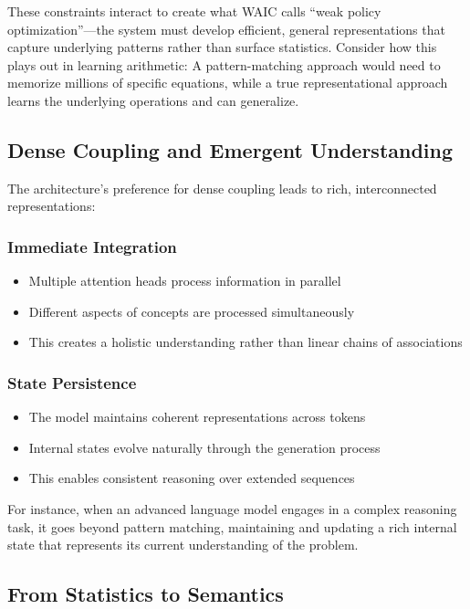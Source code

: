 \documentclass[12pt]{article}
\begin{document}
These constraints interact to create what WAIC calls ``weak policy optimization''---the system must develop efficient, general representations that capture underlying patterns rather than surface statistics. Consider how this plays out in learning arithmetic: A pattern-matching approach would need to memorize millions of specific equations, while a true representational approach learns the underlying operations and can generalize.

\subsection{Dense Coupling and Emergent Understanding}

The architecture's preference for dense coupling leads to rich, interconnected representations:

\subsubsection{Immediate Integration}
\begin{itemize}
    \item Multiple attention heads process information in parallel
    \item Different aspects of concepts are processed simultaneously
    \item This creates a holistic understanding rather than linear chains of associations
\end{itemize}

\subsubsection{State Persistence}
\begin{itemize}
    \item The model maintains coherent representations across tokens
    \item Internal states evolve naturally through the generation process
    \item This enables consistent reasoning over extended sequences
\end{itemize}

For instance, when an advanced language model engages in a complex reasoning task, it goes beyond pattern matching, maintaining and updating a rich internal state that represents its current understanding of the problem.

\subsection{From Statistics to Semantics}
\end{document}
